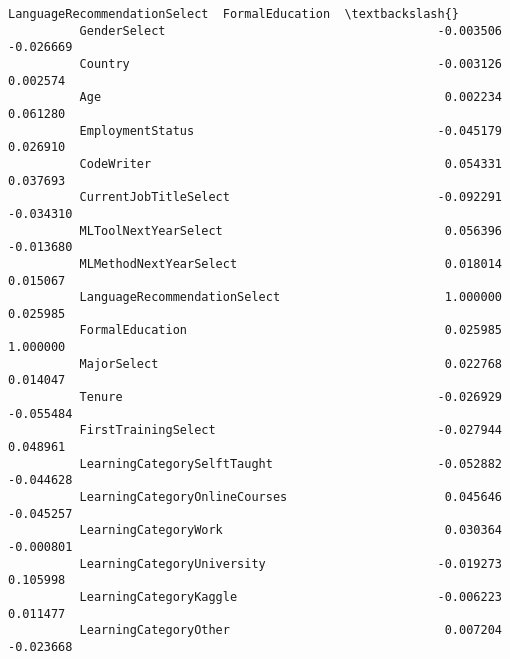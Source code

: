 \documentclass[11pt]{article}
\begin{document}
\begin{Verbatim}[commandchars=\\\{\}]
                                         LanguageRecommendationSelect  FormalEducation  \textbackslash{}
          GenderSelect                                      -0.003506        -0.026669   
          Country                                           -0.003126         0.002574   
          Age                                                0.002234         0.061280   
          EmploymentStatus                                  -0.045179         0.026910   
          CodeWriter                                         0.054331         0.037693   
          CurrentJobTitleSelect                             -0.092291        -0.034310   
          MLToolNextYearSelect                               0.056396        -0.013680   
          MLMethodNextYearSelect                             0.018014         0.015067   
          LanguageRecommendationSelect                       1.000000         0.025985   
          FormalEducation                                    0.025985         1.000000   
          MajorSelect                                        0.022768         0.014047   
          Tenure                                            -0.026929        -0.055484   
          FirstTrainingSelect                               -0.027944         0.048961   
          LearningCategorySelftTaught                       -0.052882        -0.044628   
          LearningCategoryOnlineCourses                      0.045646        -0.045257   
          LearningCategoryWork                               0.030364        -0.000801   
          LearningCategoryUniversity                        -0.019273         0.105998   
          LearningCategoryKaggle                            -0.006223         0.011477   
          LearningCategoryOther                              0.007204        -0.023668   
          

\end{Verbatim}
\end{document}
